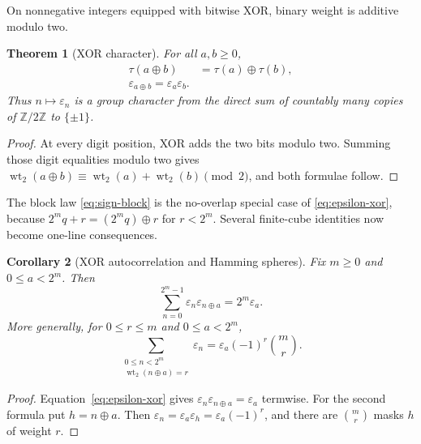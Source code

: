 \documentclass[11pt,oneside]{article}
\newtheorem{theorem}{Theorem}[section]
\newtheorem{corollary}[theorem]{Corollary}
\theoremstyle{definition}
\theoremstyle{remark}
\newcommand{\Z}{\mathbb Z}
\newcommand{\wt}{\operatorname{wt}_2}
\newcommand{\xor}{\mathbin{\oplus}}
\begin{document}
On nonnegative integers equipped with bitwise XOR, binary weight is additive
modulo two.

\begin{theorem}[XOR character]
\label{thm:xor-character}
For all $a,b\ge0$,
\begin{align}
  \tau(a\xor b)&=\tau(a)\xor\tau(b),                        \label{eq:tau-xor}\\
  \boxed{\displaystyle
  \varepsilon_{a\xor b}=\varepsilon_a\varepsilon_b.}      \label{eq:epsilon-xor}
\end{align}
Thus $n\mapsto\varepsilon_n$ is a group character from the direct sum of
countably many copies of $\Z/2\Z$ to $\{\pm1\}$.
\end{theorem}

\begin{proof}
At every digit position, XOR adds the two bits modulo two.  Summing those digit
equalities modulo two gives
$\wt(a\xor b)\equiv\wt(a)+\wt(b)\pmod2$, and both formulae follow.
\end{proof}

The block law \eqref{eq:sign-block} is the no-overlap special case of
\eqref{eq:epsilon-xor}, because $2^mq+r=(2^mq)\xor r$ for $r<2^m$.
Several finite-cube identities now become one-line consequences.

\begin{corollary}[XOR autocorrelation and Hamming spheres]
\label{cor:xor-correlations}
Fix $m\ge0$ and $0\le a<2^m$.  Then
\begin{equation}
  \sum_{n=0}^{2^m-1}\varepsilon_n\varepsilon_{n\xor a}
  =2^m\varepsilon_a.                                       \label{eq:xor-autocorrelation}
\end{equation}
More generally, for $0\le r\le m$ and $0\le a<2^m$,
\begin{equation}
  \sum_{\substack{0\le n<2^m\\ \wt(n\xor a)=r}}
       \varepsilon_n
  =\varepsilon_a(-1)^r\binom mr.                           \label{eq:hamming-sphere-sum}
\end{equation}
\end{corollary}

\begin{proof}
Equation~\eqref{eq:epsilon-xor} gives
$\varepsilon_n\varepsilon_{n\xor a}=\varepsilon_a$ termwise.
For the second formula put $h=n\xor a$.  Then
$\varepsilon_n=\varepsilon_a\varepsilon_h=\varepsilon_a(-1)^r$,
and there are $\binom mr$ masks $h$ of weight $r$.
\end{proof}
\end{document}
